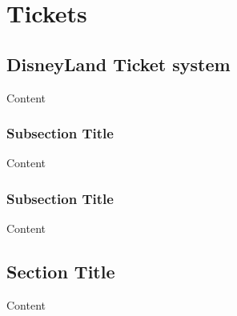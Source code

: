 
\chapter{Tickets} %

\label{ch:tickets} %


\section{DisneyLand Ticket system}

Content


\subsection{Subsection Title}

Content


\subsection{Subsection Title}

Content


\section{Section Title}

Content